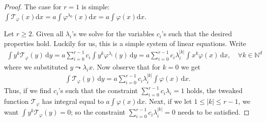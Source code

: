 \begin{proof}
    The case for $r = 1$ is simple: $\int \mathcal{T}_{\varphi}(x) \mathrm{d}x = a \int \varphi^{\lambda_0}(x) \mathrm{d}x = a \int \varphi(x) \mathrm{d}x$.  

    Let $r \geq 2$. Given all $\lambda_i$'s we solve for the variables $c_i$'s such that the desired properties hold. Luckily for us, this is a simple system of linear equations. Write
    \begin{align*}
        \int y^k \mathcal{T}_{\varphi}(y) \, \mathrm{d}y = a \sum^{r-1}_{i=0} c_i \int y^k \varphi^{\lambda_i}(y) \, \mathrm{d}y =  a \sum^{r-1}_{i=0} c_i \lambda_i^{|k|} \int x^k \varphi(x) \, \mathrm{d}x, \quad \forall k \in \mathbb{N}^d
    \end{align*}
    where we substituted $y \leadsto \lambda_i x$. Now observe that for $k = 0$ we get
    \begin{align*}
        \int \mathcal{T}_{\varphi}(y) \, \mathrm{d}y = a \sum^{r-1}_{i=0} c_i \lambda_i^{|k|} \int \varphi(x) \, \mathrm{d}x.
    \end{align*} 
    Thus, if we find $c_i$'s  such that the constraint $\sum^{r-1}_{i=0} c_i \lambda_i= 1$ holds, the tweaked function $\mathcal{T}_{\varphi}$ has integral equal to $a \int \varphi(x) \mathrm{d}x$. Next, if we let $1 \leq |k| \leq r - 1$, we want $\int y^k \mathcal{T}_{\varphi}(y) = 0$; so the constraint $\sum^{r-1}_{i=0} c_i \lambda_i^{|k|} = 0$ needs to be satisfied.


\end{proof}
